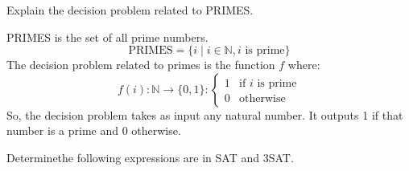 \documentclass[a4paper, 12pt]{exam}
\begin{document}
\begin{questions}
\question
  Explain the decision problem related to PRIMES.
  \begin{solution}
    PRIMES is the set of all prime numbers.
      $$ \textrm{PRIMES} = \{ i \mid i \in \mathbb{N} , i \textrm{ is prime} \} $$
    The decision problem related to primes is the function $f$ where:
      $$ f(i):\mathbb{N} \rightarrow \{0,1\}: \left\{
            \begin{array}{ll}
              1 & \textrm{if } i \textrm{ is prime} \\
              0 & \textrm{otherwise}
            \end{array}
        \right. $$
    So, the decision problem takes as input any natural number.
    It outputs 1 if that number is a prime and 0 otherwise.
  \end{solution}


  \question
  Determinethe following expressions are in SAT and 3SAT.
  \begin{solution}
\end{solution}
\end{questions}
\end{document}
